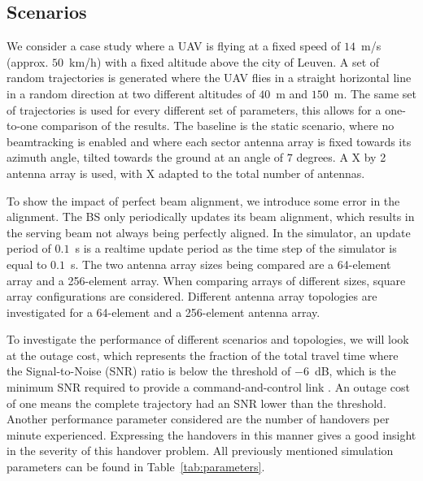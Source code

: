 \documentclass[conference,twocolumn]{IEEEtran}
\begin{document}
\subsection{Scenarios}
\par We consider a case study where a UAV is flying at a fixed speed of $14$~m/s (approx. $50$~km/h) with a fixed altitude above the city of Leuven. A set of random trajectories is generated where the UAV flies in a straight horizontal line in a random direction at two different altitudes of $40$~m and $150$~m. The same set of trajectories is used for every different set of parameters, this allows for a one-to-one comparison of the results. The baseline is the static scenario, where no beamtracking is enabled and where each sector antenna array is fixed towards its azimuth angle, tilted towards the ground at an angle of $7$ degrees. A X by 2 antenna array is used, with X adapted to the total number of antennas.
\par To show the impact of perfect beam alignment, we introduce some error in the alignment. The BS only periodically updates its beam alignment, which results in the serving beam not always being perfectly aligned. In the simulator, an update period of $0.1$~s is a realtime update period as the time step of the simulator is equal to $0.1$~s. The two antenna array sizes being compared are a 64-element array and a 256-element array. When comparing arrays of different sizes, square array configurations are considered. Different antenna array topologies are investigated for a 64-element and a 256-element antenna array.
\par To investigate the performance of different scenarios and topologies, we will look at the outage cost, which represents the fraction of the total travel time where the Signal-to-Noise (SNR) ratio is below the threshold of $-6$~dB, which is the minimum SNR required to provide a command-and-control link \cite{Colpaert2018}. An outage cost of one means the complete trajectory had an SNR lower than the threshold. Another performance parameter considered are the number of handovers per minute experienced. Expressing the handovers in this manner gives a good insight in the severity of this handover problem. All previously mentioned simulation parameters can be found in Table~\ref{tab:parameters}.
\end{document}

